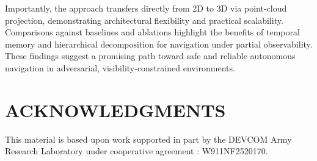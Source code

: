 \documentclass[letterpaper, 10 pt, conference]{ieeeconf}
\begin{document}
Importantly, the approach transfers directly from 2D to 3D via point-cloud projection, demonstrating architectural flexibility and practical scalability. Comparisons against baselines and ablations highlight the benefits of temporal memory and hierarchical decomposition for navigation under partial observability. These findings suggest a promising path toward safe and reliable autonomous navigation in adversarial, visibility-constrained environments.

\section*{ACKNOWLEDGMENTS}
This material is based upon work supported in part by the DEVCOM Army Research Laboratory under cooperative agreement : W911NF2520170.

{\small


}
\end{document}
